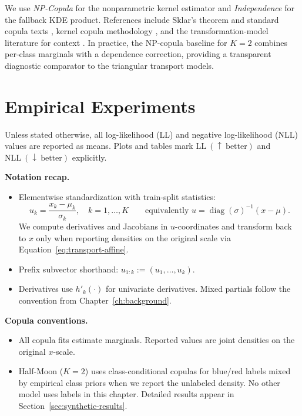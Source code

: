 \documentclass[11pt,a4paper,twoside]{book}\usepackage[]{graphicx}\usepackage[]{xcolor}
\begin{document}
We use \textit{NP-Copula} for the nonparametric kernel estimator and \textit{Independence} for the fallback KDE product. References include Sklar’s theorem and standard copula texts \citep{sklar1959fonctions,nelsen2006introduction,joe2014dependence}, kernel copula methodology \citep{nagler2017kdecopula}, and the transformation-model literature for context \citep{hothorn2021transformation}. In practice, the NP-copula baseline for $K=2$ combines per-class marginals with a dependence correction, providing a transparent diagnostic comparator to the triangular transport models.





\chapter{Empirical Experiments}\label{ch:dataanalysis}


Unless stated otherwise, all log-likelihood (LL) and negative log-likelihood (NLL) values are reported as means. Plots and tables mark $\text{LL}~(\uparrow~\text{better})$ and $\text{NLL}~(\downarrow~\text{better})$ explicitly.

\textbf{Notation recap.}
\begin{itemize}
 \item Elementwise standardization with train-split statistics:
 \[ 
 u_k = \frac{x_k - \mu_k}{\sigma_k},\quad k = 1,\ldots,K
 \qquad\text{equivalently } u = \operatorname{diag}(\sigma)^{-1}(x - \mu).
 \]
 We compute derivatives and Jacobians in $u$-coordinates and transform back to $x$ only when reporting densities on the original scale via Equation~\eqref{eq:transport-affine}.
 \item Prefix subvector shorthand: $u_{1:k} := (u_1,\ldots,u_k)$.
 \item Derivatives use $h'_k(\cdot)$ for univariate derivatives. Mixed partials follow the convention from Chapter~\ref{ch:background}.
\end{itemize}

\textbf{Copula conventions.}
\begin{itemize}
 \item All copula fits estimate marginals. Reported values are joint densities on the original $x$-scale.
 \item Half-Moon ($K=2$) uses class-conditional copulas for blue/red labels mixed by empirical class priors when we report the unlabeled density. No other model uses labels in this chapter. Detailed results appear in Section~\ref{sec:synthetic-results}.
\end{itemize}
\end{document}
